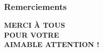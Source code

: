 \documentclass[handout]{beamer}
\newtheorem{pbm et hypo}[thm]{Problématique et hypothèses}
\begin{document}
	\begin{frame}
		\frametitle{Remerciements }
		
		\selectfont %
		
		\centering
		\vspace{1cm}
		\textcolor{blue!85!black}{\textbf{\Huge MERCI À TOUS}}\\
		\vspace{0.5cm}
		\textcolor{blue!75!black}{\textbf{\Huge POUR VOTRE}}\\
		\vspace{0.5cm}
		\textcolor{blue!65!black}{\textbf{\Huge AIMABLE ATTENTION !}}
	\end{frame}
	
	
	
\end{document}
